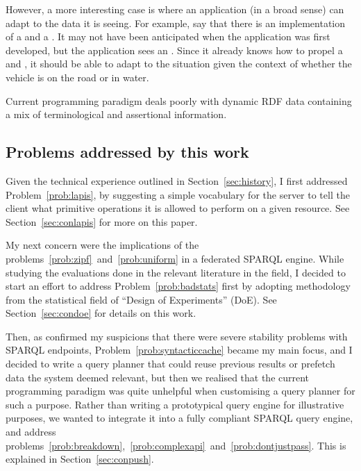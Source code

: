 However, a more interesting case is where an application (in a broad
sense) can adapt to the data it is seeing. For example, say that there
is an implementation of a  and a . It may
not have been anticipated when the application was first developed,
but the application sees an . Since it
already knows how to propel a  and , it
should be able to adapt to the situation given the context of whether
the vehicle is on the road or in water.

\begin{problem}\label{prob:dynaprog}
Current programming paradigm deals poorly with dynamic RDF data
containing a mix of terminological and assertional information.
\end{problem}


\subsection{Problems addressed by this work}\label{sec:probaddress}

Given the technical experience outlined in Section~\ref{sec:history},
I first addressed Problem~\ref{prob:lapis}, by suggesting a simple
vocabulary for the server to tell the client what primitive operations
it is allowed to perform on a given resource. See
Section~\ref{sec:conlapis} for more on this paper.

My next concern were the implications of the
problems~\ref{prob:zipf}~and~\ref{prob:uniform} in a federated SPARQL
engine. While studying the evaluations done in the relevant literature
in the field, I decided to start an effort to address
Problem~\ref{prob:badstats} first by adopting methodology from the
statistical field of ``Design of Experiments'' (DoE). See
Section~\ref{sec:condoe} for details on this work.

Then, as \cite{buil2013sparql} confirmed my suspicions that there were
severe stability problems with SPARQL endpoints,
Problem~\ref{prob:syntacticcache} became my main focus, and I decided
to write a query planner that could reuse previous results or prefetch
data the system deemed relevant, but then we realised that the current
programming paradigm was quite unhelpful when customising a query
planner for such a purpose. Rather than writing a prototypical query
engine for illustrative purposes, we wanted to integrate it into a
fully compliant SPARQL query engine, and address
problems~\ref{prob:breakdown},~\ref{prob:complexapi}~and~\ref{prob:dontjustpass}. This
is explained in Section~\ref{sec:conpush}.


